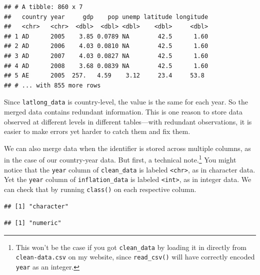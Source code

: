 \documentclass[12pt,oneside,openany]{book}
\newenvironment{Shaded}{\begin{snugshade}}{\end{snugshade}}
\newcommand{\KeywordTok}[1]{\textcolor[rgb]{0.13,0.29,0.53}{\textbf{#1}}}
\newcommand{\OperatorTok}[1]{\textcolor[rgb]{0.81,0.36,0.00}{\textbf{#1}}}
\newcommand{\NormalTok}[1]{#1}
\begin{document}
\begin{verbatim}
## # A tibble: 860 x 7
##   country year     gdp    pop unemp latitude longitude
##   <chr>   <chr>  <dbl>  <dbl> <dbl>    <dbl>     <dbl>
## 1 AD      2005    3.85 0.0789 NA        42.5      1.60
## 2 AD      2006    4.03 0.0810 NA        42.5      1.60
## 3 AD      2007    4.03 0.0827 NA        42.5      1.60
## 4 AD      2008    3.68 0.0839 NA        42.5      1.60
## 5 AE      2005  257.   4.59    3.12     23.4     53.8 
## # ... with 855 more rows
\end{verbatim}

Since \texttt{latlong\_data} is country-level, the value is the same for
each year. So the merged data contains redundant information. This is
one reason to store data observed at different levels in different
tables---with redundant observations, it is easier to make errors yet
harder to catch them and fix them.

We can also merge data when the identifier is stored across multiple
columns, as in the case of our country-year data. But first, a technical
note.\footnote{This won't be the case if you got \texttt{clean\_data} by
  loading it in directly from \texttt{clean-data.csv} on my website,
  since \texttt{read\_csv()} will have correctly encoded \texttt{year}
  as an integer.} You might notice that the \texttt{year} column of
\texttt{clean\_data} is labeled \texttt{\textless{}chr\textgreater{}},
as in character data. Yet the \texttt{year} column of
\texttt{inflation\_data} is labeled
\texttt{\textless{}int\textgreater{}}, as in integer data. We can check
that by running \texttt{class()} on each respective column.

\begin{Shaded}
\end{Shaded}

\begin{verbatim}
## [1] "character"
\end{verbatim}

\begin{Shaded}
\end{Shaded}

\begin{verbatim}
## [1] "numeric"
\end{verbatim}
\end{document}
